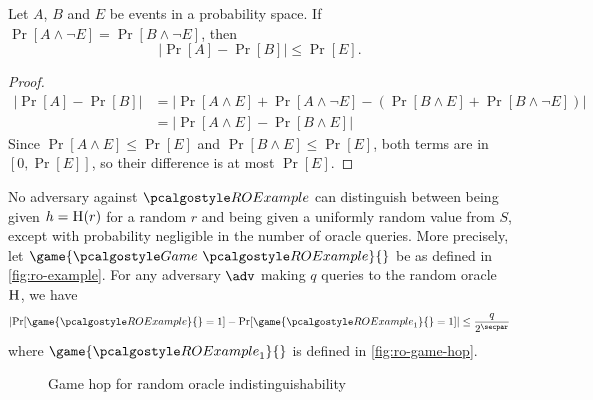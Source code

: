 \begin{lemma}\label{lem:difference}
  Let $A$, $B$ and $E$ be events in a probability space. If $\Pr[A \wedge \neg E] = \Pr[B \wedge \neg E]$, then
  \[
  |\Pr[A] - \Pr[B]| \leq \Pr[E].
  \]
\end{lemma}

\begin{proof}
  \begin{align*}
    |\Pr[A] - \Pr[B]| &= |\Pr[A \wedge E] + \Pr[A \wedge \neg E] - (\Pr[B \wedge E] + \Pr[B \wedge \neg E])| \\
    &= |\Pr[A \wedge E] - \Pr[B \wedge E]|
  \end{align*}
  Since $\Pr[A \wedge E] \leq \Pr[E]$ and $\Pr[B \wedge E] \leq \Pr[E]$, both terms are in $[0, \Pr[E]]$, so their difference is at most $\Pr[E]$.
\end{proof}


\begin{lemma}\label{lem:ro-indistinguishable}
  No adversary against $\algo{ROExample}$ can distinguish between being given $h = {\normalfont\textsc{H}}(r)$ for a random $r$ and being given a uniformly random value from $S$, except with probability negligible in the number of oracle queries.
  More precisely, let $\game{\Game~\algo{ROExample}}{}$ be as defined in \autoref{fig:ro-example}.
  For any adversary $\adv$ making $q$ queries to the random oracle ${\normalfont\textsc{H}}$, we have
  \[
  \left|\Pr[\game{\algo{ROExample}}{} = 1] - \Pr[\game{\algo{ROExample}_1}{} = 1]\right| \leq \frac{q}{2^\secpar}
  \]
  where $\game{\algo{ROExample}_1}{}$ is defined in \autoref{fig:ro-game-hop}.
\end{lemma}

\begin{figure}[tbhp]
  \begin{center}
    \begin{tcolorbox}[width=8cm]
      \begin{pchstack}
        \pchspace
      \end{pchstack}
    \end{tcolorbox}
  \end{center}
  \caption{Game hop for random oracle indistinguishability\label{fig:ro-game-hop}}
\end{figure}

